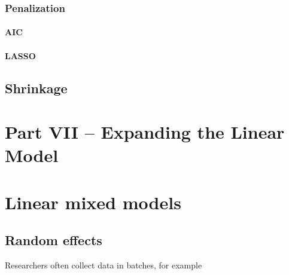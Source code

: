 \documentclass[]{book}
\begin{document}
\hypertarget{penalization}{%
\subsection{Penalization}\label{penalization}}

\hypertarget{aic}{%
\subsubsection{AIC}\label{aic}}

\hypertarget{lasso}{%
\subsubsection{LASSO}\label{lasso}}

\hypertarget{shrinkage}{%
\section{Shrinkage}\label{shrinkage}}

\hypertarget{part-vii-expanding-the-linear-model}{%
\chapter*{Part VII -- Expanding the Linear Model}\label{part-vii-expanding-the-linear-model}}

\hypertarget{linear-mixed-models}{%
\chapter{Linear mixed models}\label{linear-mixed-models}}

\hypertarget{random-effects}{%
\section{Random effects}\label{random-effects}}

Researchers often collect data in batches, for example
\end{document}
